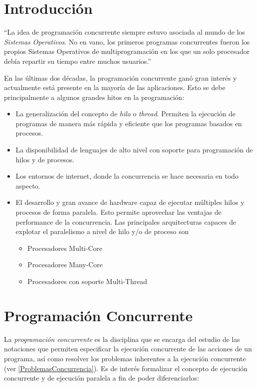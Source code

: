 \section{Introducción}
\label{IntroduccionConcurrencia}

``La idea de programación concurrente siempre estuvo asociada al mundo de los
\textit{Sistemas Operativos}. No en vano, los primeros programas concurrentes
fueron los propios Sistemas Operativos de multiprogramación en los que un solo
procesador debía repartir su tiempo entre muchos usuarios.''\cite{PalmaConcurrente}

En las últimas dos décadas, la programación concurrente ganó gran interés y
actualmente está presente en la mayoría de las aplicaciones.
Esto se debe principalmente a algunos grandes hitos en la programación:
\begin{itemize}
	\item La generalización del concepto de \textit{hilo} o \textit{thread}.
	Permiten la ejecución de programas de manera más rápida y eficiente que los programas
	basados en procesos.
	\item La disponibilidad de lenguajes de alto nivel con soporte para
	programación de hilos y de procesos.
	\item Los entornos de internet, donde la concurrencia se hace necesaria
	en todo aspecto.
	\item El desarrollo y gran avance de hardware capaz de ejecutar múltiples hilos
	y procesos de forma paralela. Esto permite aprovechar las ventajas de
	performance de la concurrencia. Las principales arquitecturas capaces de
	explotar el paralelismo a nivel de hilo y/o de proceso son
	\begin{itemize}
	    \item Procesadores Multi-Core
	    \item Procesadores Many-Core
	    \item Procesadores con soporte Multi-Thread
    \end{itemize}
\end{itemize}

\section{Programación Concurrente}
\label{ProgramacionConcurrente}

La \textit{programación concurrente} es la disciplina que se encarga del estudio
de las notaciones que permiten especificar la ejecución concurrente de las
acciones de un programa, así como resolver los problemas inherentes a la
ejecución concurrente (ver \ref{ProblemasConcurrencia}). Es de interés
formalizar el concepto de ejecución concurrente y de ejecución paralela a fin
de poder diferenciarlos:

